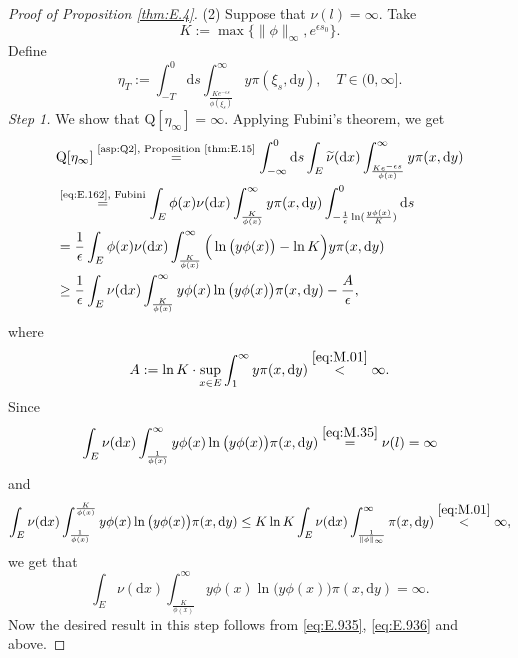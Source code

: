 \documentclass[12pt,a4paper]{amsart}
\numberwithin{equation}{section}
\theoremstyle{plain}
\theoremstyle{definition}
\theoremstyle{remark}
\begin{document}
\begin{proof}[Proof of Proposition \ref{thm:E.4}]
	(2) Suppose that $\nu(l)=\infty$.
	Take
\begin{equation} \label{eq:E.934}
	K
	:= \max \{\|\phi\|_\infty,e^{\epsilon s_0}\}.
\end{equation}
	Define
\begin{equation}\label{eq:E.9341}
	\eta_T
	:= \int_{-T}^{0} \mathrm ds \int_{\frac{Ke^{-\epsilon s}}{\phi(\xi_s)}}^\infty y\pi(\xi_s,\mathrm dy),
	\quad T \in (0,\infty].
\end{equation}
	\emph{Step 1.} We show that $\mathrm Q[\eta_\infty]=\infty.$
	Applying Fubini's theorem, we get
\begin{align}
	&\mathrm Q[\eta_\infty]
	\overset{\text{\eqref{asp:Q2}, Proposition \ref{thm:E.15}}}= \int_{-\infty}^{0} \mathrm ds \int_E \widetilde\nu(\mathrm dx) \int_{\frac{Ke^{-\epsilon s}}{\phi(x)}}^\infty y\pi(x, \mathrm dy)
	\\ &\overset{\text{\eqref{eq:E.162}, Fubini}}= \int_E\phi(x)\nu(\mathrm dx)\int_{\frac{K}{\phi(x)}}^\infty y\pi(x, \mathrm dy)\int_{-\frac{1}{\epsilon}\ln(\frac{y\phi(x)}{K})}^0\mathrm ds
	\\&=\frac{1}{\epsilon}\int_E\phi(x)\nu(\mathrm dx)\int_{\frac{K}{\phi(x)}}^\infty\Big(\ln\big(y\phi(x)\big)-\ln K\Big)y\pi(x, \mathrm dy)
	\\\label{eq:E.935}&\geq \frac{1}{\epsilon}\int_E\nu(\mathrm dx) \int_{\frac{K}{\phi(x)}}^\infty y\phi(x)\ln \big(y\phi(x)\big)\pi(x, \mathrm dy)-\frac{A}{\epsilon},
\end{align}
	where
\begin{equation} \label{eq:E.936}
	A
	:= \ln K \cdot \sup_{x\in E} \int_1^\infty y \pi(x,\mathrm dy)
	\overset{\eqref{eq:M.01}}< \infty.
\end{equation}
	Since
\[
	\int_E\nu(\mathrm dx) \int_{\frac{1}{\phi(x)}}^\infty y\phi(x)\ln \big(y\phi(x)\big)\pi(x, \mathrm dy)
	\overset{\eqref{eq:M.35}}= \nu(l)
	=\infty
\]
	and
\begin{align}
	\int_E\nu(\mathrm dx) \int_{\frac{1}{\phi(x)}}^{\frac{K}{\phi(x)}} y\phi(x)\ln \big(y\phi(x)\big)\pi(x, \mathrm dy)
	\leq K \ln K \int_E \nu(\mathrm dx) \int_{\frac{1}{\|\phi\|_\infty}}^\infty \pi(x, \mathrm dy)
	\overset{\eqref{eq:M.01}}<\infty,
\end{align}
	we get that
\begin{equation}
	\int_E\nu(\mathrm dx) \int_{\frac{K}{\phi(x)}}^\infty y\phi(x)\ln \big(y\phi(x)\big)\pi(x, \mathrm dy)
	= \infty.
\end{equation}
	Now the desired result in this step follows from \eqref{eq:E.935}, \eqref{eq:E.936} and above.
	

\end{proof}
\end{document}
